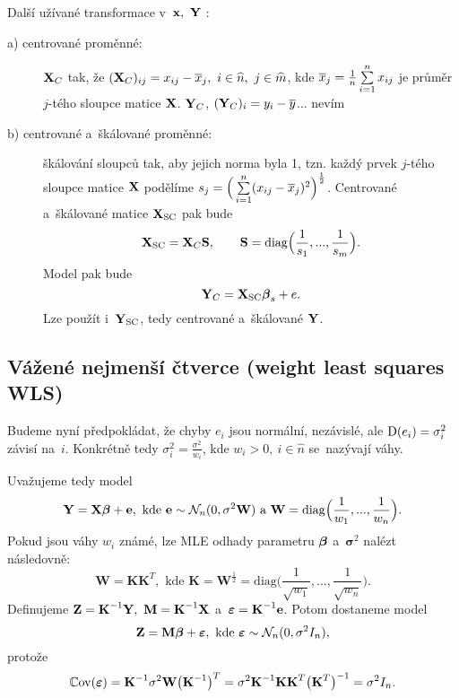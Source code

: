 \begin{remark}
	Další užívané transformace v~$\mathbf{x},~\mathbf{Y}$ :\begin{description}
	\item[a) centrované proměnné:] $\mathbf{X}_C$ tak, že $(\mathbf{X}_C)_{ij} = x_{ij}-\overline{x}_j,~i\in\widehat{n},~j\in\widehat{m}$, kde $\overline{x}_j = \frac{1}{n}\sum\limits_{i=1}^{n} x_{ij}$ je průměr $j$-tého sloupce matice $\mathbf{X}$. $\mathbf{Y}_C$, $(\mathbf{Y}_C)_i = y_i-\overline{y}$... nevím
	\item[b) centrované a~škálované proměnné:] škálování sloupců tak, aby jejich norma byla 1, tzn. každý prvek $j$-tého sloupce matice $\mathbf{X}$ podělíme $s_j = \Big(\sum\limits_{i=1}^{n} (x_{ij}-\overline{x}_j)^2\Big)^{\frac{1}{2}}$. Centrované a~škálované matice $\mathbf{X}_\mathrm{SC}$ pak bude
	 $$
	\mathbf{X}_\mathrm{SC} = \mathbf{X}_C\textbf{S},\qquad \textbf{S} = \mathrm{diag}\Big(\frac{1}{s_1},...,\frac{1}{s_m}\Big).
	 $$
	Model pak bude
	 $$
	\mathbf{Y}_C = \mathbf{X}_\mathrm{SC}\boldsymbol{\beta}_s+e. $$ Lze použít i~$\mathbf{Y}_\mathrm{SC}$, tedy centrované a~škálované $\mathbf{Y}$.
	\end{description}
\end{remark}

\subsection*{Vážené nejmenší čtverce (weight least squares WLS)}
Budeme nyní předpokládat, že chyby $e_i$ jsou normální, nezávislé, ale $\mathrm{D}(e_i) = \sigma_i^2$ závisí na~$i$. Konkrétně tedy $\sigma_i^2 = \frac{\sigma^2}{w_i}$, kde $w_i>0,~i\in\widehat{n}$ se~nazývají váhy.

Uvažujeme tedy model
\begin{equation}\label{rovnickaW}
\mathbf{Y} = \mathbf{X}\boldsymbol{\beta}+\mathbf{e},\text{ kde }\mathbf{e}\sim\mathcal{N}_n(0,\sigma^2\textbf{W})\text{ a~}\textbf{W} = \mathrm{diag}\Big(\frac{1}{w_1},...,\frac{1}{w_n}\Big).
\end{equation}
Pokud jsou váhy $w_i$ známé, lze MLE odhady parametru $\boldsymbol{\beta}$ a~$\boldsymbol{\sigma}^2$ nalézt následovně:
 $$
\textbf{W} = \textbf{K} \textbf{K}^T,\text{ kde }\textbf{K} = \textbf{W}^{\frac{1}{2}} = \mathrm{diag}\Big(\frac{1}{\sqrt{w_1}},...,\frac{1}{\sqrt{w_n}}\Big).
 $$
Definujeme $\textbf{Z} = {\textbf{K}^{-1}}\mathbf{Y},~\textbf{M} = {\textbf{K}^{-1}}\mathbf{X}$ a~$\boldsymbol{\varepsilon} = {\textbf{K}^{-1}}\mathbf{e}$. Potom dostaneme model
\begin{equation}\label{rovnickaW2}
\textbf{Z} = \textbf{M}\boldsymbol{\beta}+\boldsymbol{\varepsilon},\text{ kde }\boldsymbol{\varepsilon}\sim\mathcal{N}_n(0,\sigma^2 I_n),
\end{equation}
protože
 $$
\mathbb{C}\mathrm{ov}(\boldsymbol{\varepsilon}) = {\textbf{K}^{-1}}\sigma^2\textbf{W}\big({\textbf{K}^{-1}}\big)^T = \sigma^2 {\textbf{K}^{-1}}\textbf{K}\textbf{K}^T\big(\textbf{K}^T\big)^{-1} = \sigma^2 I_n.
 $$

